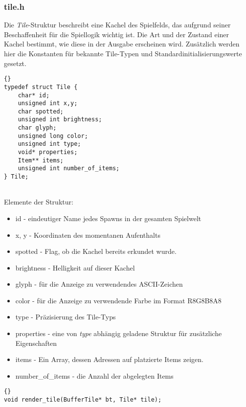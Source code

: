 \documentclass[11pt,a4paper,notitlepage]{report}
\begin{document}
	\newpage
	\subsubsection*{tile.h}
Die \textit{Tile}-Struktur beschreibt eine Kachel des Spielfelds, das aufgrund seiner Beschaffenheit für die Spiellogik wichtig ist. Die Art und der Zustand einer Kachel bestimmt, wie diese in der Ausgabe erscheinen wird. Zusätzlich werden hier die Konstanten für bekannte Tile-Typen und Standardinitialisierungswerte gesetzt.

		\begin{lstlisting}[caption=Tile]{}
typedef struct Tile {
	char* id;
	unsigned int x,y;
	char spotted;
	unsigned int brightness;
	char glyph;
	unsigned long color;
	unsigned int type;
	void* properties;
	Item** items;
	unsigned int number_of_items;
} Tile;
		\end{lstlisting} \hspace*{\fill} \\
Elemente der Struktur:
		\begin{itemize}
			\item id - eindeutiger Name jedes Spawns in der gesamten Spielwelt
			\item x, y - Koordinaten des momentanen Aufenthalts
			\item spotted - Flag, ob die Kachel bereits erkundet wurde.
			\item brightness - Helligkeit auf dieser Kachel
			\item glyph - für die Anzeige zu verwendendes ASCII-Zeichen
			\item color - für die Anzeige zu verwendende Farbe im Format R8G8B8A8
			\item type - Präzisierung des Tile-Typs
			\item properties - eine von \textit{type} abhängig geladene Struktur für zusätzliche Eigenschaften
			\item items - Ein Array, dessen Adressen auf platzierte Items zeigen.
			\item number\_of\_items - die Anzahl der abgelegten Items
		\end{itemize}
		
		\begin{lstlisting}[caption=render\_tile]{}
void render_tile(BufferTile* bt, Tile* tile);
		\end{lstlisting}
		
\end{document}
